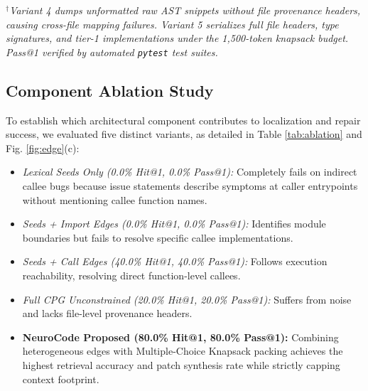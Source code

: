 \documentclass[conference]{IEEEtran}
\begin{document}
\begin{table}[h]
\centering
\caption{Component Ablation and Patch Verification ($N=5$ Multi-Module Bug Benchmark)}
\label{tab:ablation}
\vspace{1mm}
\footnotesize{$^\dagger$\textit{Variant 4 dumps unformatted raw AST snippets without file provenance headers, causing cross-file mapping failures. Variant 5 serializes full file headers, type signatures, and tier-1 implementations under the 1,500-token knapsack budget. Pass@1 verified by automated \texttt{pytest} test suites.}}
\end{table}

\subsection{Component Ablation Study}
To establish which architectural component contributes to localization and repair success, we evaluated five distinct variants, as detailed in Table \ref{tab:ablation} and Fig. \ref{fig:edge}(c):
\begin{itemize}
    \item \textit{Lexical Seeds Only (0.0\% Hit@1, 0.0\% Pass@1):} Completely fails on indirect callee bugs because issue statements describe symptoms at caller entrypoints without mentioning callee function names.
    \item \textit{Seeds + Import Edges (0.0\% Hit@1, 0.0\% Pass@1):} Identifies module boundaries but fails to resolve specific callee implementations.
    \item \textit{Seeds + Call Edges (40.0\% Hit@1, 40.0\% Pass@1):} Follows execution reachability, resolving direct function-level callees.
    \item \textit{Full CPG Unconstrained (20.0\% Hit@1, 20.0\% Pass@1):} Suffers from noise and lacks file-level provenance headers.
    \item \textbf{NeuroCode Proposed (80.0\% Hit@1, 80.0\% Pass@1):} Combining heterogeneous edges with Multiple-Choice Knapsack packing achieves the highest retrieval accuracy and patch synthesis rate while strictly capping context footprint.
\end{itemize}
\end{document}
